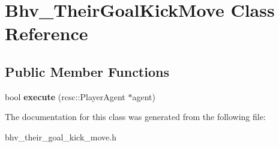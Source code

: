 \hypertarget{classBhv__TheirGoalKickMove}{
\section{Bhv\_\-TheirGoalKickMove Class Reference}
\label{classBhv__TheirGoalKickMove}
}
\subsection*{Public Member Functions}
\begin{DoxyCompactItemize}
\item 
\hypertarget{classBhv__TheirGoalKickMove_aebe3c1c017c49b94c2732d2074dc4eb9}{
bool {\bfseries execute} (rcsc::PlayerAgent $\ast$agent)}
\label{classBhv__TheirGoalKickMove_aebe3c1c017c49b94c2732d2074dc4eb9}

\end{DoxyCompactItemize}


The documentation for this class was generated from the following file:\begin{DoxyCompactItemize}
\item 
bhv\_\-their\_\-goal\_\-kick\_\-move.h\end{DoxyCompactItemize}
